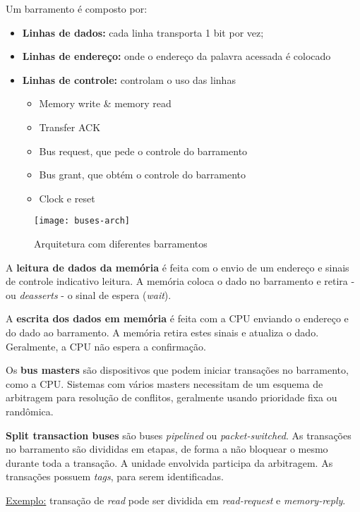 Um barramento é composto por:

\begin{itemize}
  \item \textbf{Linhas de dados:} cada linha transporta 1 bit por vez;

  \item \textbf{Linhas de endereço:} onde o endereço da palavra acessada é colocado

  \item \textbf{Linhas de controle:} controlam o uso das linhas
    \begin{itemize}
      \item Memory write \& memory read
      \item Transfer ACK
      \item Bus request, que pede o controle do barramento
      \item Bus grant, que obtém o controle do barramento
      \item Clock e reset
    \end{itemize}
\end{itemize}

\begin{figure}
  \centering
  \texttt{[image: buses-arch]}
  \label{fig:buses-arch}
  \caption{Arquitetura com diferentes barramentos}
\end{figure}

A \textbf{leitura de dados da memória} é feita com o envio de um endereço e sinais de controle indicativo leitura. A memória coloca o dado no barramento e retira - ou \textit{deasserts} - o sinal de espera (\textit{wait}).

A \textbf{escrita dos dados em memória} é feita com a CPU enviando o endereço e do dado ao barramento. A memória retira estes sinais e atualiza o dado. Geralmente, a CPU não espera a confirmação.

Os \textbf{bus masters} são dispositivos que podem iniciar transações no barramento, como a CPU. Sistemas com vários masters necessitam de um esquema de arbitragem para resolução de conflitos, geralmente usando prioridade fixa ou randômica.


\textbf{Split transaction buses} são buses \textit{pipelined} ou \textit{packet-switched}. As transações no barramento são divididas em etapas, de forma a não bloquear o mesmo durante toda a transação. A unidade envolvida participa da arbitragem. As transações possuem \textit{tags}, para serem identificadas.

\underline{Exemplo:} transação de \textit{read} pode ser dividida em \textit{read-request} e \textit{memory-reply}.



